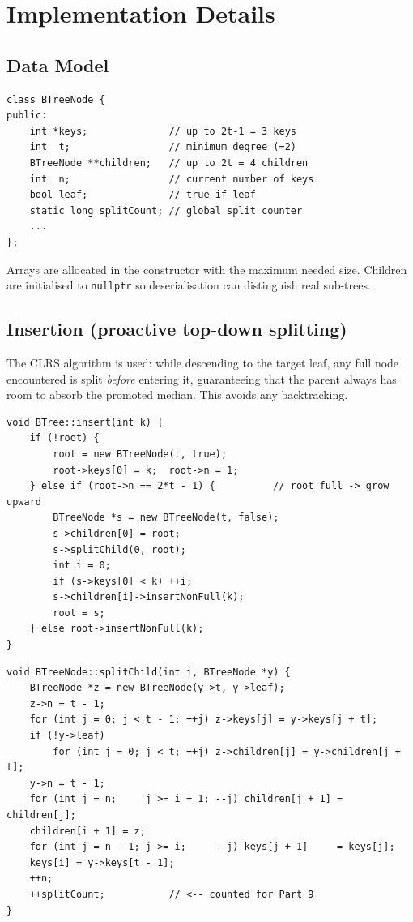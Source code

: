 \documentclass[11pt,a4paper]{article}
\begin{document}
\section{Implementation Details}

\subsection{Data Model}

\begin{lstlisting}[style=cpp]
class BTreeNode {
public:
    int *keys;              // up to 2t-1 = 3 keys
    int  t;                 // minimum degree (=2)
    BTreeNode **children;   // up to 2t = 4 children
    int  n;                 // current number of keys
    bool leaf;              // true if leaf
    static long splitCount; // global split counter
    ...
};
\end{lstlisting}

\noindent Arrays are allocated in the constructor with the maximum needed size. Children are initialised to \texttt{nullptr} so deserialisation can distinguish real sub-trees.

\subsection{Insertion (proactive top-down splitting)}

The CLRS algorithm is used: while descending to the target leaf, any full node encountered is split \emph{before} entering it, guaranteeing that the parent always has room to absorb the promoted median. This avoids any backtracking.

\begin{lstlisting}[style=cpp]
void BTree::insert(int k) {
    if (!root) {
        root = new BTreeNode(t, true);
        root->keys[0] = k;  root->n = 1;
    } else if (root->n == 2*t - 1) {          // root full -> grow upward
        BTreeNode *s = new BTreeNode(t, false);
        s->children[0] = root;
        s->splitChild(0, root);
        int i = 0;
        if (s->keys[0] < k) ++i;
        s->children[i]->insertNonFull(k);
        root = s;
    } else root->insertNonFull(k);
}
\end{lstlisting}

\begin{lstlisting}[style=cpp]
void BTreeNode::splitChild(int i, BTreeNode *y) {
    BTreeNode *z = new BTreeNode(y->t, y->leaf);
    z->n = t - 1;
    for (int j = 0; j < t - 1; ++j) z->keys[j] = y->keys[j + t];
    if (!y->leaf)
        for (int j = 0; j < t; ++j) z->children[j] = y->children[j + t];
    y->n = t - 1;
    for (int j = n;     j >= i + 1; --j) children[j + 1] = children[j];
    children[i + 1] = z;
    for (int j = n - 1; j >= i;     --j) keys[j + 1]     = keys[j];
    keys[i] = y->keys[t - 1];
    ++n;
    ++splitCount;           // <-- counted for Part 9
}
\end{lstlisting}
\end{document}

